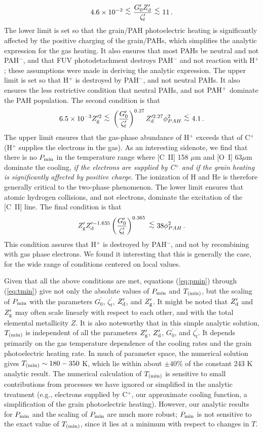 \documentclass[12pt,preprint,flushrt]{aastex}
\newcommand{\beq}{\begin{equation}}
\newcommand{\eeq}{\end{equation}}
\newcommand{\pmin}{P_{\rm min}}
\newcommand{\al}{\mbox{ \raisebox{-.4ex}{$\stackrel{\textstyle <}{\sim}$} }}
\newcommand{\tmin}{T_{\rm (min)}}
\newcommand{\gs}{G_{0}^\prime}
\newcommand{\zd}{Z_{\rm d}^\prime}
\newcommand{\zg}{Z_{\rm g}^\prime}
\newcommand{\zio}{\zeta_{t}^\prime}
\begin{document}
\beq
4.6\times 10^{-2} \al {{ \gs \zd}\over {\zio}} \al 11 \, .
\label{eq:con1}
\eeq
The lower limit is set so that the grain/PAH photoelectric
heating is significantly affected by the positive charging of the
grain/PAHs, which simplifies the analytic expression for the gas heating.
It also ensures
that most PAHs be neutral and not PAH$^-$, and that
FUV photodetachment
destroys PAH$^-$ and not reaction with H$^+$; these assumptions were made
in deriving the analytic expression. The upper limit
is set so that H$^+$ is destroyed by PAH$^-$, and not neutral PAHs.
It also ensures the less restrictive condition that neutral PAHs,
and not ${\rm PAH^+}$ dominate the PAH population. The second condition
is that
\beq
6.5\times 10^{-3}Z_{\rm g}^{\prime 2} \al \left({\gs \over \zio}\right)^{0.27}
Z_{\rm d}^{\prime 2.27}\phi _{PAH}^2 \al 4.1 \, .
\label{eq:con2}
\eeq
The upper limit ensures that the gas-phase abundance of H$^+$ exceeds that
of C$^+$ (H$^+$ supplies the electrons in the gas). As an interesting
sidenote, we find that there is no $\pmin$ in the temperature
range where [C~II] 158 $\mu$m and [O~I] 63$\mu$m dominate the cooling,
{\it if the electrons are supplied by C$^+$ and if the grain heating
is significantly affected by positive charge}. The ionization of
H and He is therefore generally critical to the two-phase phenomenon.
The lower limit ensures that atomic hydrogen collisions, and not
electrons, dominate the excitation of the [C~II] line.  
The final condition is that
\beq
\zg  {Z_{\rm d}^{\prime -1.635}} \left({\gs \over \zio}\right)^{0.365}
    \al 38\phi _{PAH}^2 \, .
\label{eq:con3}
\eeq
This condition assures that H$^+$ is destroyed by PAH$^-$, and not
by recombining with gas phase electrons. We found it interesting
that this is generally the case, for the wide range of conditions
centered on local values.

Given that all the above conditions are met, equations
(\ref{eq:pmin}) through (\ref{eq:tmin}) give
not only the absolute values of $\pmin$ and $\tmin$, but the scaling
of $\pmin$ with
the parameters  $\gs$, $\zio$, $\zd$, and $\zg$.
It might be
noted that $\zd$ and $\zg$ may often scale linearly with respect
to each other, and with the total elemental metallicity $Z$. It
is also noteworthy that
in this simple analytic solution, $\tmin$ is independent
of all the parameters $\zg$, $\zd$, $\gs$, and $\zio$. 
It depends primarily on the
gas temperature dependence of the cooling rates and the grain photoelectric
heating rate.
In much of parameter space, the numerical solution gives
$\tmin \sim 180-350$ K, which lie within about $\pm 40$\% of the
constant 243 K analytic result.
The numerical 
calculation of $\tmin$ is sensitive to small contributions from
processes we have ignored or simplified in the analytic treatment
(e.g., electrons supplied
by C$^+$, our approximate cooling function, a simplification of
the grain photoelectric heating).  However, our analytic results
for $\pmin$ and the scaling of $\pmin$ are much more robust;
$\pmin$ is not sensitive to the exact value of $\tmin$, since
it lies at a minimum with respect to changes in $T$.
\end{document}
